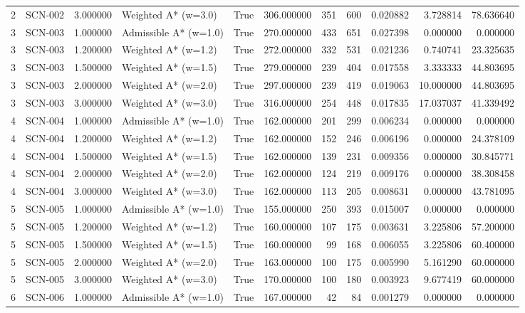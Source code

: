 \begin{table}[htbp]
\begin{tabular}{rlrlrrrrrrr}
2 & SCN-002 & 3.000000 & Weighted A* (w=3.0) & True & 306.000000 & 351 & 600 & 0.020882 & 3.728814 & 78.636640 \\
3 & SCN-003 & 1.000000 & Admissible A* (w=1.0) & True & 270.000000 & 433 & 651 & 0.027398 & 0.000000 & 0.000000 \\
3 & SCN-003 & 1.200000 & Weighted A* (w=1.2) & True & 272.000000 & 332 & 531 & 0.021236 & 0.740741 & 23.325635 \\
3 & SCN-003 & 1.500000 & Weighted A* (w=1.5) & True & 279.000000 & 239 & 404 & 0.017558 & 3.333333 & 44.803695 \\
3 & SCN-003 & 2.000000 & Weighted A* (w=2.0) & True & 297.000000 & 239 & 419 & 0.019063 & 10.000000 & 44.803695 \\
3 & SCN-003 & 3.000000 & Weighted A* (w=3.0) & True & 316.000000 & 254 & 448 & 0.017835 & 17.037037 & 41.339492 \\
4 & SCN-004 & 1.000000 & Admissible A* (w=1.0) & True & 162.000000 & 201 & 299 & 0.006234 & 0.000000 & 0.000000 \\
4 & SCN-004 & 1.200000 & Weighted A* (w=1.2) & True & 162.000000 & 152 & 246 & 0.006196 & 0.000000 & 24.378109 \\
4 & SCN-004 & 1.500000 & Weighted A* (w=1.5) & True & 162.000000 & 139 & 231 & 0.009356 & 0.000000 & 30.845771 \\
4 & SCN-004 & 2.000000 & Weighted A* (w=2.0) & True & 162.000000 & 124 & 219 & 0.009176 & 0.000000 & 38.308458 \\
4 & SCN-004 & 3.000000 & Weighted A* (w=3.0) & True & 162.000000 & 113 & 205 & 0.008631 & 0.000000 & 43.781095 \\
5 & SCN-005 & 1.000000 & Admissible A* (w=1.0) & True & 155.000000 & 250 & 393 & 0.015007 & 0.000000 & 0.000000 \\
5 & SCN-005 & 1.200000 & Weighted A* (w=1.2) & True & 160.000000 & 107 & 175 & 0.003631 & 3.225806 & 57.200000 \\
5 & SCN-005 & 1.500000 & Weighted A* (w=1.5) & True & 160.000000 & 99 & 168 & 0.006055 & 3.225806 & 60.400000 \\
5 & SCN-005 & 2.000000 & Weighted A* (w=2.0) & True & 163.000000 & 100 & 175 & 0.005990 & 5.161290 & 60.000000 \\
5 & SCN-005 & 3.000000 & Weighted A* (w=3.0) & True & 170.000000 & 100 & 180 & 0.003923 & 9.677419 & 60.000000 \\
6 & SCN-006 & 1.000000 & Admissible A* (w=1.0) & True & 167.000000 & 42 & 84 & 0.001279 & 0.000000 & 0.000000 \\

\end{tabular}
\end{table}
